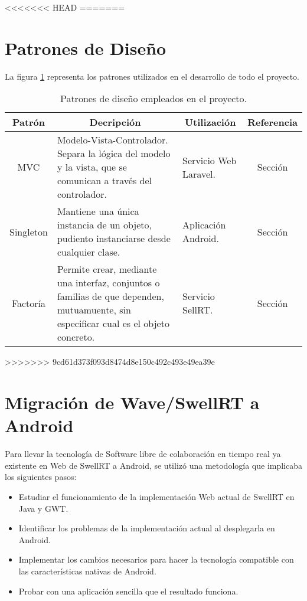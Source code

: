 <<<<<<< HEAD
=======
\section{Patrones de Diseño}

La figura \ref{fig:tablePatrones} representa los patrones utilizados en el desarrollo de todo el proyecto.

\begin{table}[!]
\centering
\caption{Patrones de diseño empleados en el proyecto.}
\label{my-label}
\begin{tabular}{|c|m{5cm}|l|c|}
\hline
{\bf Patrón} & \multicolumn{1}{c|}{{\bf Decripción}}                                                                                                & \multicolumn{1}{c|}{{\bf Utilización}} & {\bf Referencia} \\ \hline
MVC          & Modelo-Vista-Controlador. Separa la lógica del modelo y la vista, que se comunican a través del controlador.                         & Servicio Web Laravel.                  & Sección          \\ \hline
Singleton    & Mantiene una única instancia de un objeto, pudiento instanciarse desde cualquier clase.                                              & Aplicación Android.                    & Sección          \\ \hline
Factoría     & Permite crear, mediante una interfaz, conjuntos o familias de que dependen, mutuamuente, sin especificar cual es el objeto concreto. & Servicio SellRT.                       & Sección          \\ \hline
\end{tabular}
\label{fig:tablePatrones}
\end{table}

>>>>>>> 9cd61d373f093d8474d8e150c492c493e49ea39e
\section{Migración de Wave/SwellRT a Android}

Para llevar la tecnología de Software libre de colaboración en tiempo real ya existente en Web de SwellRT a Android, se utilizó una metodología que implicaba los siguientes pasos:

    \begin{itemize}
      \item Estudiar el funcionamiento de la implementación Web actual de SwellRT en Java y GWT.
      \item Identificar los problemas de la implementación actual al desplegarla en Android. 
      \item Implementar los cambios necesarios para hacer la tecnología compatible con las características nativas de Android.
      \item Probar con una aplicación sencilla que el resultado funciona.
    \end{itemize}
    
